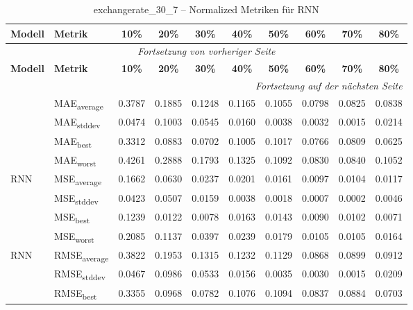 {\small
\begin{longtable}{l l c c c c c c c c}
    \toprule
    \textbf{Modell} & \textbf{Metrik} & \textbf{10\%} & \textbf{20\%} & \textbf{30\%} & \textbf{40\%} & \textbf{50\%} & \textbf{60\%} & \textbf{70\%} & \textbf{80\%} \\
    \midrule
    \endfirsthead
    \multicolumn{10}{c}{\textit{Fortsetzung von vorheriger Seite}} \\
    \toprule
    \textbf{Modell} & \textbf{Metrik} & \textbf{10\%} & \textbf{20\%} & \textbf{30\%} & \textbf{40\%} & \textbf{50\%} & \textbf{60\%} & \textbf{70\%} & \textbf{80\%} \\
    \midrule
    \endhead
    \midrule
    \multicolumn{10}{r}{\textit{Fortsetzung auf der nächsten Seite}} \\
    \midrule
    \endfoot
    \bottomrule
    \caption{exchangerate_30_7 -- Normalized Metriken für RNN}
    \label{tab:exchangerate_30_7_normalized_rnn}
    \endlastfoot
\multirow{4}{*}{RNN} & MAE\textsubscript{average} & 0.3787 & 0.1885 & 0.1248 & 0.1165 & 0.1055 & 0.0798 & 0.0825 & 0.0838 \\
 & MAE\textsubscript{stddev} & 0.0474 & 0.1003 & 0.0545 & 0.0160 & 0.0038 & 0.0032 & 0.0015 & 0.0214 \\
 & MAE\textsubscript{best} & 0.3312 & 0.0883 & 0.0702 & 0.1005 & 0.1017 & 0.0766 & 0.0809 & 0.0625 \\
 & MAE\textsubscript{worst} & 0.4261 & 0.2888 & 0.1793 & 0.1325 & 0.1092 & 0.0830 & 0.0840 & 0.1052 \\
\cmidrule(lr){2-10}
\multirow{4}{*}{RNN} & MSE\textsubscript{average} & 0.1662 & 0.0630 & 0.0237 & 0.0201 & 0.0161 & 0.0097 & 0.0104 & 0.0117 \\
 & MSE\textsubscript{stddev} & 0.0423 & 0.0507 & 0.0159 & 0.0038 & 0.0018 & 0.0007 & 0.0002 & 0.0046 \\
 & MSE\textsubscript{best} & 0.1239 & 0.0122 & 0.0078 & 0.0163 & 0.0143 & 0.0090 & 0.0102 & 0.0071 \\
 & MSE\textsubscript{worst} & 0.2085 & 0.1137 & 0.0397 & 0.0239 & 0.0179 & 0.0105 & 0.0105 & 0.0164 \\
\cmidrule(lr){2-10}
\multirow{4}{*}{RNN} & RMSE\textsubscript{average} & 0.3822 & 0.1953 & 0.1315 & 0.1232 & 0.1129 & 0.0868 & 0.0899 & 0.0912 \\
 & RMSE\textsubscript{stddev} & 0.0467 & 0.0986 & 0.0533 & 0.0156 & 0.0035 & 0.0030 & 0.0015 & 0.0209 \\
 & RMSE\textsubscript{best} & 0.3355 & 0.0968 & 0.0782 & 0.1076 & 0.1094 & 0.0837 & 0.0884 & 0.0703 \\

\end{longtable}}
